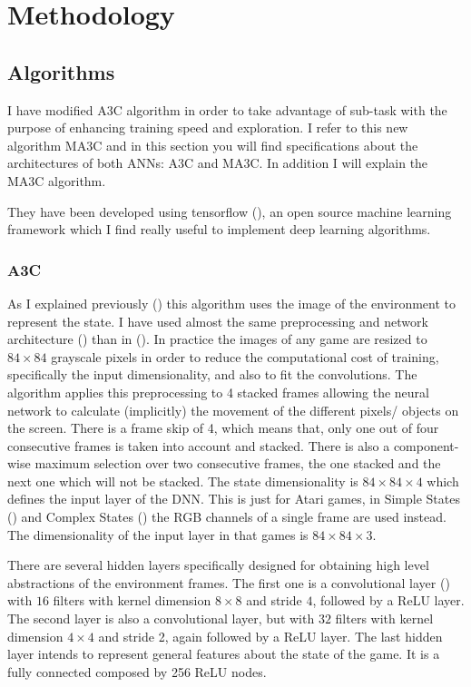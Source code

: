 \chapter{Methodology}

\section{Algorithms}

I have modified \ac{A3C} algorithm in order to take advantage of sub-task with the purpose of enhancing training speed
and exploration.
I refer to this new algorithm \acf{MA3C} and in this section you will find specifications about the architectures of
both \acp{ANN}: \ac{A3C} and \ac{MA3C}.
In addition I will explain the \ac{MA3C} algorithm.

They have been developed using tensorflow (\cite{tensorflow2015}), an open source machine learning framework which I find
really useful to implement deep learning algorithms.

\subsection{\acl{A3C}}

As I explained previously () this algorithm uses the image of the environment to represent the state.
I have used almost the same preprocessing and network architecture () than in  (\cite{mnih2016A3C}).
In practice the images of any game are resized to $84 \times 84$ grayscale pixels in order to reduce the computational cost of training,
specifically the input dimensionality, and also to fit the convolutions.
The algorithm applies this preprocessing to 4 stacked frames allowing the neural network to calculate (implicitly) the movement
of the different pixels/ objects on the screen.
There is a frame skip of 4, which means that, only one out of four consecutive frames is taken into account and stacked.
There is also a component-wise maximum selection over two consecutive frames, the one stacked and the next one which will
not be stacked.
The state dimensionality is $84 \times 84 \times 4$ which defines the input layer of the \ac{DNN}.
This is just for Atari games, in Simple States () and Complex States ()
the RGB channels of a single frame are used instead.
The dimensionality of the input layer in that games is $84 \times 84 \times 3$.

There are several hidden layers specifically designed for obtaining high level abstractions of the environment frames.
The first one is a convolutional layer () with $16$ filters with kernel dimension $8 \times 8$ and stride $4$,
followed by a \ac{ReLU} layer.
The second layer is also a convolutional layer, but with $32$ filters with kernel dimension $4 \times 4$ and stride 2,
again followed by a \ac{ReLU} layer.
The last hidden layer intends to represent general features about the state of the game.
It is a fully connected composed by 256 ReLU nodes.

